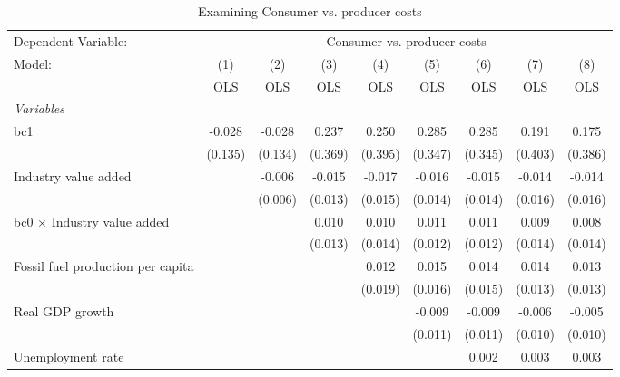 
\begin{table}[htbp]
   \caption{Examining Consumer vs. producer costs}
   \centering
   \begin{tabular}{lcccccccc}
      \toprule
      Dependent Variable: & \multicolumn{8}{c}{Consumer vs. producer costs}\\
      Model:                                  & (1)     & (2)     & (3)     & (4)     & (5)     & (6)     & (7)     & (8)\\  
                                              &  OLS    & OLS     & OLS     & OLS     & OLS     & OLS     & OLS     & OLS\\  
      \midrule
      \emph{Variables}\\
      bc1                                     & -0.028  & -0.028  & 0.237   & 0.250   & 0.285   & 0.285   & 0.191   & 0.175\\   
                                              & (0.135) & (0.134) & (0.369) & (0.395) & (0.347) & (0.345) & (0.403) & (0.386)\\   
      Industry value added                    &         & -0.006  & -0.015  & -0.017  & -0.016  & -0.015  & -0.014  & -0.014\\   
                                              &         & (0.006) & (0.013) & (0.015) & (0.014) & (0.014) & (0.016) & (0.016)\\   
      bc0 $\times$ Industry value added       &         &         & 0.010   & 0.010   & 0.011   & 0.011   & 0.009   & 0.008\\   
                                              &         &         & (0.013) & (0.014) & (0.012) & (0.012) & (0.014) & (0.014)\\   
      Fossil fuel production per capita       &         &         &         & 0.012   & 0.015   & 0.014   & 0.014   & 0.013\\   
                                              &         &         &         & (0.019) & (0.016) & (0.015) & (0.013) & (0.013)\\   
      Real GDP growth                         &         &         &         &         & -0.009  & -0.009  & -0.006  & -0.005\\   
                                              &         &         &         &         & (0.011) & (0.011) & (0.010) & (0.010)\\   
      Unemployment rate                       &         &         &         &         &         & 0.002   & 0.003   & 0.003\\   

\end{tabular}
\end{table}
